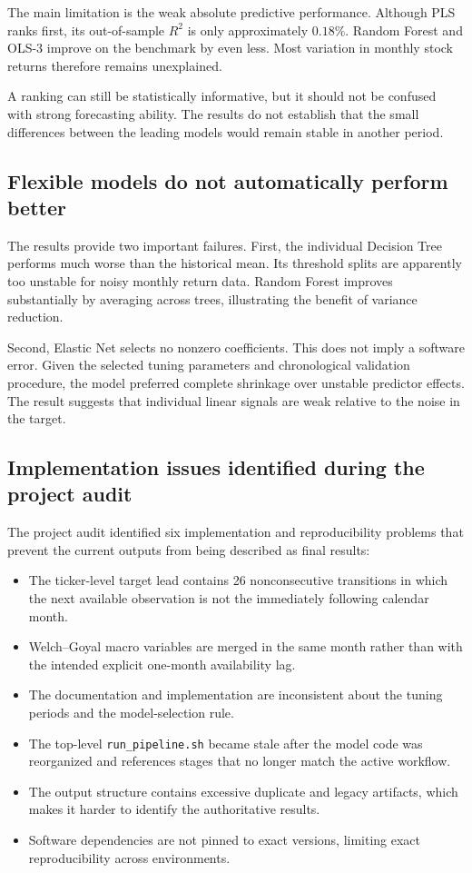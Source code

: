\documentclass[11pt,a4paper]{article}
\begin{document}
The main limitation is the weak absolute predictive performance. Although PLS
ranks first, its out-of-sample \(R^2\) is only approximately \(0.18\%\). Random
Forest and OLS-3 improve on the benchmark by even less. Most variation in
monthly stock returns therefore remains unexplained.

A ranking can still be statistically informative, but it should not be confused
with strong forecasting ability. The results do not establish that the small
differences between the leading models would remain stable in another period.

\subsection{Flexible models do not automatically perform better}

The results provide two important failures. First, the individual Decision Tree
performs much worse than the historical mean. Its threshold splits are
apparently too unstable for noisy monthly return data. Random Forest improves
substantially by averaging across trees, illustrating the benefit of variance
reduction.

Second, Elastic Net selects no nonzero coefficients. This does not imply a
software error. Given the selected tuning parameters and chronological
validation procedure, the model preferred complete shrinkage over unstable
predictor effects. The result suggests that individual linear signals are weak
relative to the noise in the target.

\subsection{Implementation issues identified during the project audit}

The project audit identified six implementation and reproducibility problems
that prevent the current outputs from being described as final results:

\begin{itemize}
  \item The ticker-level target lead contains 26 nonconsecutive transitions in
        which the next available observation is not the immediately following
        calendar month.
  \item Welch--Goyal macro variables are merged in the same month rather than
        with the intended explicit one-month availability lag.
  \item The documentation and implementation are inconsistent about the tuning
        periods and the model-selection rule.
  \item The top-level \texttt{run\_pipeline.sh} became stale after the model
        code was reorganized and references stages that no longer match the
        active workflow.
  \item The output structure contains excessive duplicate and legacy artifacts,
        which makes it harder to identify the authoritative results.
  \item Software dependencies are not pinned to exact versions, limiting exact
        reproducibility across environments.
\end{itemize}
\end{document}
